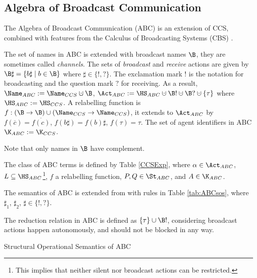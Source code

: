\documentclass[adraft,hidelinks]{eptcs}
\begin{document}
\subsection{Algebra of Broadcast Communication}
\label{sec:abc}
The Algebra of Broadcast Communication (ABC) \cite{vGH15} is an extension of CCS, combined with features from the Calculus of Broadcasting Systems (CBS) \cite{KP91}.

The set of names in ABC is extended with broadcast names $\B$, they are sometimes called \emph{channels}.
The sets of \emph{broadcast} and \emph{receive} actions are given by $\B\sharp = \{b\sharp \mid b\in\B\}$ where $\sharp\in\{!, ?\}$.
The exclamation mark $!$ is the notation for broadcasting and the question mark $?$ for receiving.
As a result, $\Name_{ABC} := \Name_{CCS}\dcup\B$, $\Act_{ABC} := \HS_{ABC}\dcup\B!\dcup\B?\dcup\{\tau\}$ where $\HS_{ABC} := \HS_{CCS}$.
A relabelling function is $f: (\B\to\B) \cup (\Name_{CCS}\to\Name_{CCS})$, it extends to $\Act_{ABC}$ by $f(\overline{c}) = \overline{f(c)}$, $f(b\sharp) = f(b)\sharp$, $f(\tau) = \tau$.
The set of agent identifiers in ABC $\K_{ABC}:=\K_{CCS}$.

Note that only names in $\B$ have complement.

The class of ABC terms is defined by Table \ref{CCSExp}, where $\alpha\in\Act_{ABC}$, $L\subseteq \HS_{ABC}$\footnote{This implies that neither silent nor broadcast actions can be restricted. }, $f$ a relabelling function, $P, Q\in\St_{ABC}$, and $A\in\K_{ABC}$.

The semantics of ABC is extended from  with rules in Table \ref{tab:ABCsos}, where $\sharp_1$, $\sharp_2$, $\sharp \in \{!, ?\}$.

The reduction relation in ABC is defined as $\{\tau\}\cup\B!$, considering broadcast actions happen autonomously, and should not be blocked in any way.

\begin{table}[t]
\normalsize
\centering
\caption{Structural Operational Semantics of ABC}
\label{tab:ABCsos}
\end{table}
\end{document}
